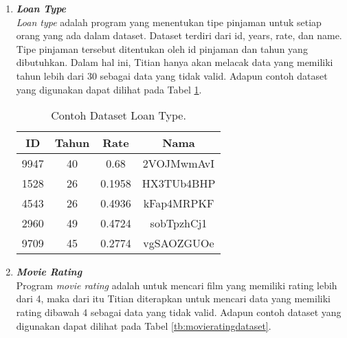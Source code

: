 \begin{enumerate}
      \item \emph{\textbf{Loan Type}} \\
            \emph{Loan type} adalah program yang menentukan tipe pinjaman untuk setiap orang yang ada dalam dataset. Dataset terdiri dari id, years, rate, dan name. Tipe pinjaman tersebut ditentukan oleh id pinjaman dan tahun yang dibutuhkan. Dalam hal ini, Titian hanya akan melacak data yang memiliki tahun lebih dari 30 sebagai data yang tidak valid.
            Adapun contoh dataset yang digunakan dapat 
            dilihat pada Tabel \ref{tb:loantypedataset}.

            \begin{longtable}{|c|c|c|c|}
                  \caption{Contoh Dataset Loan Type.}
                  \label{tb:loantypedataset} \\
                  \hline
                  \rowcolor[HTML]{C0C0C0}
                  \textbf{ID} & \textbf{Tahun} & \textbf{Rate} & \textbf{Nama} \\
                  \hline
                  9947 & 40 & 0.68 & 2VOJMwmAvI \\
                  1528 & 26 & 0.1958 & HX3TUb4BHP \\
                  4543 & 26 & 0.4936 & kFap4MRPKF \\
                  2960 & 49 & 0.4724 & sobTpzhCj1 \\
                  9709 & 45 & 0.2774 & vgSAOZGUOe \\
                  \hline
            \end{longtable}

      \item \emph{\textbf{Movie Rating}} \\
            Program \emph{movie rating} adalah untuk mencari film yang memiliki rating lebih dari 4, maka dari itu Titian diterapkan untuk mencari data yang memiliki rating dibawah 4 sebagai data yang tidak valid.
            Adapun contoh dataset yang digunakan dapat 
            dilihat pada Tabel \ref{tb:movieratingdataset}.


\end{enumerate}
